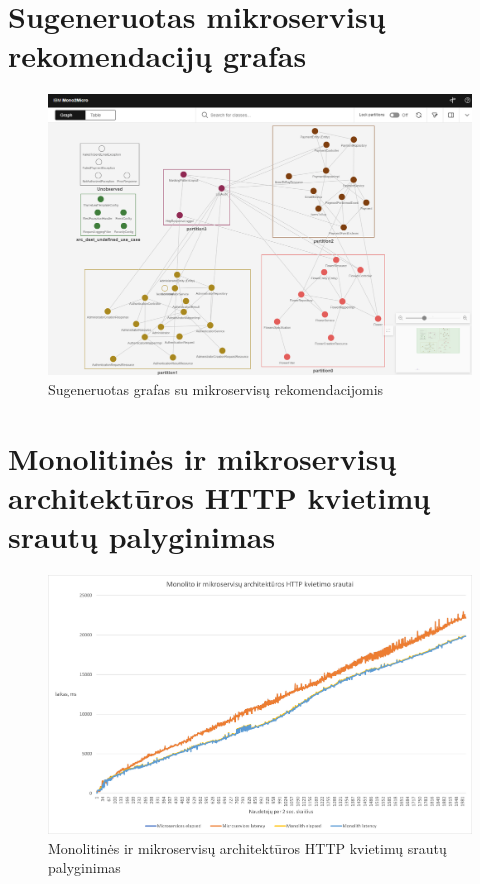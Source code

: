 \documentclass{VUMIFPSbakalaurinis}
\begin{document}
\section{Sugeneruotas mikroservisų rekomendacijų grafas}
\begin{figure}[H]
    \centering
    \includegraphics[scale=0.4]{img/grafas.png}
    \caption{Sugeneruotas grafas su mikroservisų rekomendacijomis}
    \label{img:grafas}
\end{figure}

\section{Monolitinės ir mikroservisų architektūros HTTP kvietimų srautų palyginimas}
\begin{figure}[H]
    \centering
    \includegraphics[scale=0.6]{img/latency.png}
    \caption{Monolitinės ir mikroservisų architektūros HTTP kvietimų srautų palyginimas}
    \label{img:latency}
\end{figure}
\end{document}
